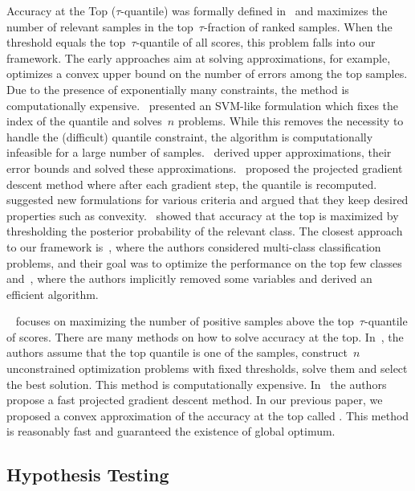 Accuracy at the Top ($\tau$-quantile) was formally defined in~\cite{boyd2012accuracy} and maximizes the number of relevant samples in the top~$\tau$-fraction of ranked samples. When the threshold equals the top~$\tau$-quantile of all scores, this problem falls into our framework. The early approaches aim at solving approximations, for example,~\cite{joachims2005svm} optimizes a convex upper bound on the number of errors among the top samples. Due to the presence of exponentially many constraints, the method is computationally expensive.~\cite{boyd2012accuracy} presented an SVM-like formulation which fixes the index of the quantile and solves~$n$ problems. While this removes the necessity to handle the (difficult) quantile constraint, the algorithm is computationally infeasible for a large number of samples.~\cite{kar2015surrogate} derived upper approximations, their error bounds and solved these approximations.~\cite{grill2016learning} proposed the projected gradient descent method where after each gradient step, the quantile is recomputed.~\cite{eban2017scalable} suggested new formulations for various criteria and argued that they keep desired properties such as convexity.~\cite{tasche2018plug} showed that accuracy at the top is maximized by thresholding the posterior probability of the relevant class. The closest approach to our framework is~\cite{lapin2015top,lapin2018analysis}, where the authors considered multi-class classification problems, and their goal was to optimize the performance on the top few classes and~\cite{mackey2018constrained}, where the authors implicitly removed some variables and derived an efficient algorithm.

\AccatTop~\cite{boyd2012accuracy} focuses on maximizing the number of positive samples above the top~$\tau$-quantile of scores. There are many methods on how to solve accuracy at the top. In~\cite{boyd2012accuracy}, the authors assume that the top quantile is one of the samples, construct~$n$ unconstrained optimization problems with fixed thresholds, solve them and select the best solution. This method is computationally expensive. In~\cite{grill2016learning} the authors propose a fast projected gradient descent method. In our previous paper, we proposed a convex approximation of the accuracy at the top called \PatMat. This method is reasonably fast and guaranteed the existence of global optimum.

\subsection{Hypothesis Testing}

